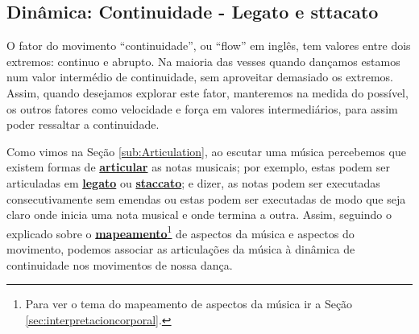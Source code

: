 \subsection{Dinâmica: Continuidade - Legato e sttacato}
\label{subsec:continuidade:ls}


O fator do movimento ``continuidade'', 
ou ``flow'' em inglês, tem valores entre dois extremos: continuo e  abrupto.
Na maioria das vesses quando dançamos estamos num valor intermédio de continuidade,
sem aproveitar demasiado os extremos.
Assim, quando desejamos explorar este fator, manteremos na medida do possível,
os outros fatores como velocidade e força em valores intermediários,
para assim poder ressaltar a continuidade.

Como vimos na Seção \ref{sub:Articulation}, 
ao escutar uma música percebemos que existem formas de \hyperref[sub:Articulation]{\textbf{articular}} as notas musicais;
por exemplo, estas podem ser articuladas em 
\hyperref[subsec:Legato]{\textbf{legato}} ou \hyperref[subsec:Staccato]{\textbf{staccato}};
e dizer, as notas podem ser executadas consecutivamente sem emendas ou 
estas podem ser executadas de modo que seja claro onde inicia uma nota musical e onde termina a outra.
Assim, 
seguindo o explicado sobre o \hyperref[sec:interpretacioncorporal]{\textbf{mapeamento}}\footnote{Para
ver o tema do mapeamento de aspectos da música ir a Seção \ref{sec:interpretacioncorporal}.} 
de aspectos da música e aspectos do movimento,
podemos associar as articulações da música à dinâmica de continuidade nos movimentos de nossa dança.\\


